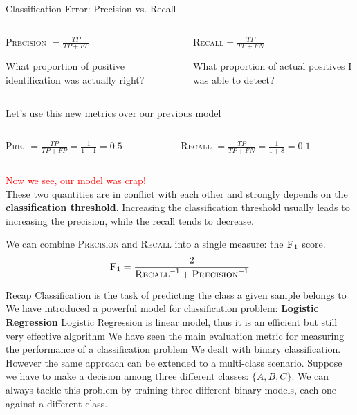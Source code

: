\documentclass{beamer}
\begin{document}
\begin{frame}{Classification Error: Precision vs. Recall}
\vskip 0.2cm
\begin{columns}
\begin{column}{0.5\textwidth}
\textsc{Precision} $= \frac{TP}{TP+FP}$\\
\begin{mdframed}[backgroundcolor=blue!30] 
\small 
	What proportion of positive identification was actually right?
\end{mdframed}
\end{column}
\begin{column}{0.5\textwidth}
\textsc{Recall}$ = \frac{TP}{TP+FN}$
\begin{mdframed}[backgroundcolor=blue!30] 
\small
        What proportion of actual positives I was able to detect?
\end{mdframed}
\end{column}
\end{columns}
\vskip 0.2cm
Let's use this new metrics over our previous model
\vskip 0.2cm
\begin{columns}
\begin{column}{0.5\textwidth}
\textsc{Pre.} $= \frac{TP}{TP+FP} = \frac{{1}}{1+1} = 0.5$
\end{column}
\begin{column}{0.5\textwidth}
\textsc{Recall} $= \frac{TP}{TP+FN} = \frac{{1}}{1+8} = 0.1$
\end{column}
\end{columns}
\pause
\vskip 0.2cm
\textcolor{red}{Now we see, our model was crap!}\\
These two quantities are in conflict with each other and strongly depends on the \textbf{classification threshold}.
Increasing the classification threshold usually leads to increasing the precision, while the recall tends
to decrease.

\pause 
\vskip 0.2cm
We can combine \textsc{Precision} and \textsc{Recall} into a single measure: the $\textsc{F}_1$ score.
\[
	\textsc{F}_1 = \frac{2}{\textsc{Recall}^{-1} + \textsc{Precision}^{-1}}
\]


\end{frame}

\begin{frame}{Recap}
Classification is the task of predicting the class a given sample belongs to
\vskip 0.2cm
We have introduced a powerful model for classification problem: \textbf{Logistic Regression}
\vskip 0.2cm
Logistic Regression is linear model, thus it is an efficient but still very effective algorithm
\vskip 0.2cm
We have seen the main evaluation metric for measuring the performance of a classification problem
\vskip 0.2cm
We dealt with binary classification. However the same approach can be extended to a multi-class scenario.
Suppose we have to make a decision among three different classes: $\{ A, B, C \}$. We can always tackle
this problem by training three different binary models, each one against a different class.
\end{frame}
\end{document}
